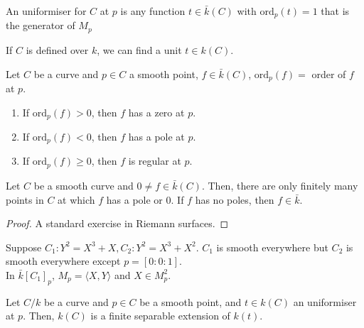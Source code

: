 \documentclass[oneside, 12pt, ]{scrbook}
\newcommand{\ord}{\mathrm{ord}}
\theoremstyle{theorem}
\begin{document}
\begin{definition}
An uniformiser for $C$ at $p$ is any function $t \in \bar{k}(C)$ with $\mathrm{ord}_{p}(t) = 1$ that is the generator of $M_{p}$
\end{definition}

\begin{remark}
If $C$ is defined over $k$, we can find a unit $t \in k(C)$.
\end{remark}

\begin{definition}
Let $C$ be a curve and $p \in C$ a smooth point, $f \in \bar{k}(C)$, $\ord_{p}(f) =$ order of $f$ at $p$.

\begin{enumerate}
\item If $\ord_{p}(f)> 0$, then $f$ has a zero at $p$.
\item If $\ord_{p}(f)< 0$, then $f$ has a pole at $p$.
\item If $\ord_{p}(f)\geq 0$, then $f$ is regular at $p$.
\end{enumerate}
\end{definition}

\begin{proposition}
Let $C$ be a smooth curve and $0 \neq f \in \bar{k}(C)$. Then, there are only finitely many points in $C$ at which $f$ has a pole or $0$. If $f$ has no poles, then $f\in \bar{k}$.
\end{proposition}

\begin{proof}
A standard exercise in Riemann surfaces.
\end{proof}

\begin{example}
Suppose $C_{1}: Y^2 = X^3 + X , C_{2}: Y^2 = X^3 + X^2$. $C_{1}$ is smooth everywhere but $C_{2}$ is smooth everywhere except $p = [0:0:1]$.\\

In $\bar{k}[C_{1}]_{p}$, $M_{p} = \langle X,Y \rangle$ and $X \in M_{p}^2$.
\end{example}

\begin{proposition}
Let $C/k$ be a curve and $p \in C$ be a smooth point, and $t \in k(C)$ an uniformiser at $p$. Then, $k(C)$ is a finite separable extension of $k(t)$.
\end{proposition}
\end{document}
